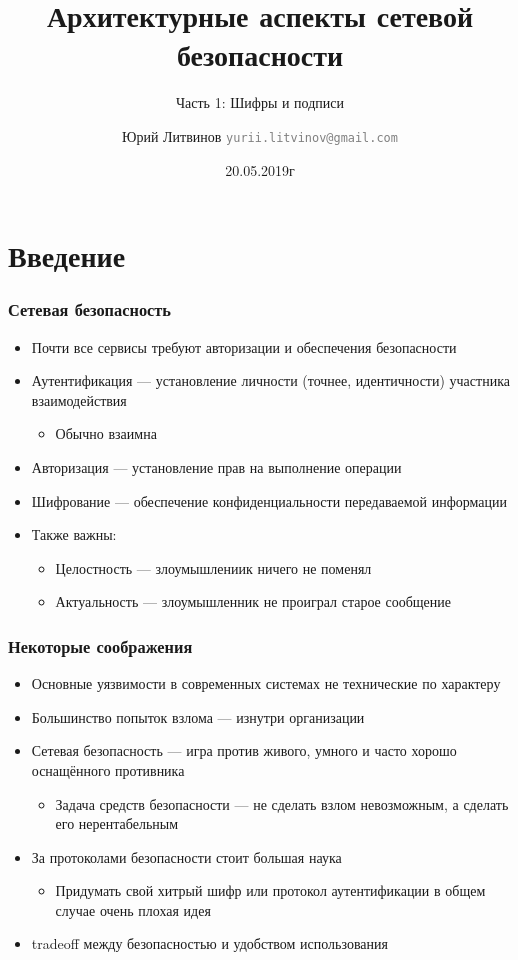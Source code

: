 \documentclass[xetex,mathserif,serif]{beamer}
\title{Архитектурные аспекты сетевой безопасности}
\subtitle{Часть 1: Шифры и подписи}
\author[Юрий Литвинов]{Юрий Литвинов \newline \textcolor{gray}{\small\texttt{yurii.litvinov@gmail.com}}}
\date{20.05.2019г}
\begin{document}
	\frame{\titlepage}

	\section{Введение}

	\begin{frame}
		\frametitle{Сетевая безопасность}
		\begin{itemize}
			\item Почти все сервисы требуют авторизации и обеспечения безопасности
			\item Аутентификация --- установление личности (точнее, идентичности) участника взаимодействия
			\begin{itemize}
				\item Обычно взаимна
			\end{itemize}
			\item Авторизация --- установление прав на выполнение операции
			\item Шифрование --- обеспечение конфиденциальности передаваемой информации
			\item Также важны:
			\begin{itemize}
				\item Целостность --- злоумышлениик ничего не поменял
				\item Актуальность --- злоумышленник не проиграл старое сообщение
			\end{itemize} 
		\end{itemize}
	\end{frame}

	\begin{frame}
		\frametitle{Некоторые соображения}
		\begin{itemize}
			\item Основные уязвимости в современных системах не технические по характеру
			\item Большинство попыток взлома --- изнутри организации
			\item Сетевая безопасность --- игра против живого, умного и часто хорошо оснащённого противника
			\begin{itemize}
				\item Задача средств безопасности --- не сделать взлом невозможным, а сделать его нерентабельным
			\end{itemize}
			\item За протоколами безопасности стоит большая наука
			\begin{itemize}
				\item Придумать свой хитрый шифр или протокол аутентификации в общем случае очень плохая идея
			\end{itemize} 
			\item tradeoff между безопасностью и удобством использования
		\end{itemize}
	\end{frame}
\end{document}
